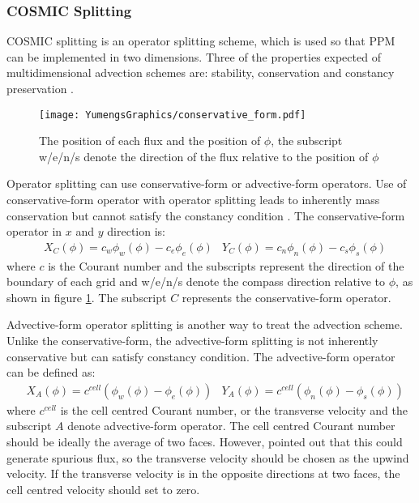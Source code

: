 \subsubsection{COSMIC Splitting}
\label{sec:COSMIC}
COSMIC splitting is an operator splitting scheme, which is used so that PPM can be implemented in two dimensions. Three of the properties expected of multidimensional advection schemes are: stability, conservation and constancy preservation \citep{Lin1996}.
\begin{figure}
\vspace{-10pt}
\centering
\texttt{[image: YumengsGraphics/conservative\_form.pdf]}
\vspace{-10pt}
\caption{The position of each flux and the position of $\phi$, the subscript w/e/n/s denote the direction of the flux relative to the position of $\phi$ \label{fig:2.2}}
\end{figure}
Operator splitting can use conservative-form or advective-form operators. Use of conservative-form operator with operator splitting leads to inherently mass conservation but cannot satisfy the constancy condition \citep{Leonard1996}. The conservative-form operator in $x$ and $y$ direction is:
\begin{eqnarray}  \label{eq:2.13}
&X_{\scriptscriptstyle C}(\phi ) = c_{w}\phi_w(\phi )-c_e\phi_e(\phi ) 
&Y_{\scriptscriptstyle C}(\phi ) = c_{n}\phi_n(\phi )-c_s\phi_s(\phi )
\end{eqnarray}
where $c$ is the Courant number and the subscripts represent the direction of the boundary of each grid and w/e/n/s denote the compass direction relative to $\phi$, as shown in figure \ref{fig:2.2}. The subscript $C$ represents the conservative-form operator.

Advective-form operator splitting is another way to treat the advection scheme. Unlike the conservative-form, the advective-form splitting is not inherently conservative but can satisfy constancy condition. The advective-form operator \citep{Leonard1996} can be defined as:
\begin{eqnarray} \label{eq:2.16}
&X_{\scriptscriptstyle A}(\phi ) = c^{cell}(\phi_w(\phi )-\phi_e(\phi )) 
&Y_{\scriptscriptstyle A}(\phi ) = c^{cell}(\phi_n(\phi )-\phi_s(\phi ))
\end{eqnarray}
where $c^{cell}$ is the cell centred Courant number, or the transverse velocity and the subscript $A$ denote advective-form operator. The cell centred Courant number should be ideally the average of two faces. However, \citep{Lin1996} pointed out that this could generate spurious flux, so the transverse velocity should be chosen as the upwind velocity. If the transverse velocity is in the opposite directions at two faces, the cell centred velocity should set to zero.

